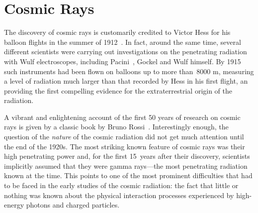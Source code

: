 %


\chapter{Cosmic Rays}

The discovery of cosmic rays is customarily credited to Victor Hess for his balloon
flights in the summer of 1912~\cite{Hess:1912srp}. In fact, around the same time,
several different scientists were carrying out investigations on the penetrating
radiation with Wulf electroscopes, including Pacini~\cite{1912NCim....3...93P},
Gockel and Wulf himself. By 1915 such instruments had been flown on balloons up
to more than~8000 m, measuring a level of radiation much larger than that recorded
by Hess in his first flight, an providing the first compelling evidence for the
extraterrestrial origin of the radiation.

A vibrant and enlightening account of the first 50 years of research on cosmic rays
is given by a classic book by Bruno Rossi~\cite{rossi1964cosmic}. Interestingly enough,
the question of the \emph{nature} of the cosmic radiation did not get much attention until
the end of the 1920s. The most striking known feature of cosmic rays was their high
penetrating power and, for the first 15~years after their discovery, scientists
implicitly assumed that they were gamma rays---the most penetrating radiation known at
the time. This points to one of the most prominent difficulties that had to be faced
in the early studies of the cosmic radiation: the fact that little or nothing was
known about the physical interaction processes experienced by high-energy photons
and charged particles.

